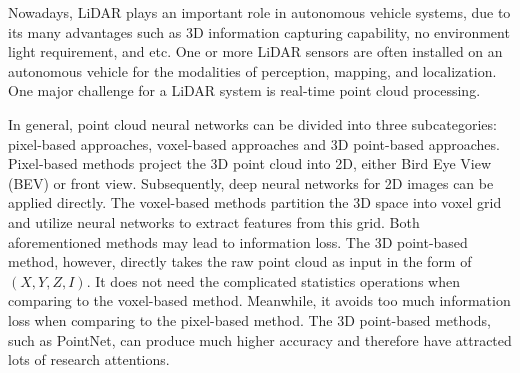 \documentclass[conference]{IEEEtran}
\begin{document}
Nowadays, LiDAR plays an important role in autonomous vehicle systems, due to its many advantages such as 3D information capturing capability, no environment light requirement, and etc. One or more LiDAR sensors are often installed on an autonomous vehicle for the modalities of perception\cite{zhou2018voxelnet}, mapping\cite{droeschel2018efficient}, and localization\cite{yin20193d}. One major challenge for a LiDAR system is real-time point cloud processing. 


In general, point cloud neural networks can be divided into three subcategories: pixel-based approaches, voxel-based approaches and 3D point-based approaches. Pixel-based methods project the 3D point cloud into 2D, either Bird Eye View (BEV) \cite{ku2018joint} or front view\cite{chen2017multi}. Subsequently, deep neural networks for 2D images can be applied directly. The voxel-based methods partition the 3D space into voxel grid and utilize neural networks to extract features from this grid. Both aforementioned methods may lead to information loss. The 3D point-based method, however, directly takes the raw point cloud as input in the form of $(X,Y,Z,I)$. It does not need the complicated statistics operations when comparing to the voxel-based method. Meanwhile, it avoids too much information loss when comparing to the pixel-based method. The 3D point-based methods, such as PointNet\cite{qi2017pointnet}, can produce much higher accuracy and therefore have attracted lots of research attentions.
\end{document}
